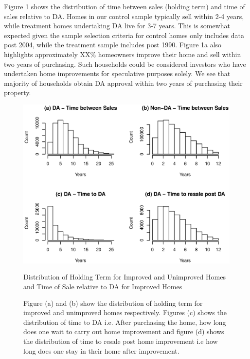 \documentclass[AEJ,reqno, draftmode]{AEA} %
\begin{document}
  

Figure \ref{fig:Rplot_month_bet_sale_notional} shows the distribution of time between sales (holding term) and time of sales relative to DA. Homes in our control sample typically sell within 2-4 years, while treatment homes undertaking DA live for 3-7 years. This is somewhat expected given the sample selection criteria for control homes only includes data post 2004, while the treatment sample includes post 1990. Figure 1a also highlights approximately XX\% homeowners improve their home and sell within two years of purchasing. Such households could be considered investors who have undertaken home improvements for speculative purposes solely. We see that majority of households obtain DA approval within two years of purchasing their property. 



\captionsetup[figure]{font=large,skip=0pt}

\begin{figure}[!htb]
    \centering
     \includegraphics[width=\columnwidth]{Figures/Rplot_time_bet_sales_notional2004.eps} \par
 \caption{Distribution of Holding Term for Improved and Unimproved Homes and Time of Sale relative to DA for Improved Homes}
 \label{fig:Rplot_month_bet_sale_notional}
 \caption*{\small Figure (a) and (b) show the distribution of holding term for improved and unimproved homes respectively. Figures (c) shows the distribution of time to DA i.e. After purchasing the home, how long does one wait to carry out home improvement and figure (d) shows the distribution of time to resale post home improvement i.e how long does one stay in their home after improvement.}
  \vspace*{-\baselineskip}
 \end{figure}
\end{document}
